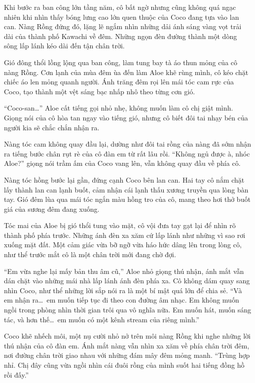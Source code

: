 ﻿\documentclass[../main.tex]{subfiles}
\begin{document}
Khi bước ra ban công lớn tầng năm, cô bất ngờ nhưng cũng không quá ngạc nhiên khi nhìn thấy bóng lưng cao lớn quen thuộc của Coco đang tựa vào lan can. Nàng Rồng đứng đó, lặng lẽ ngắm nhìn những dải ánh sáng vàng vọt trải dài của thành phố Kawachi về đêm. Những ngọn đèn đường thành một dòng sông lấp lánh kéo dài đến tận chân trời.

Gió đông thổi lồng lộng qua ban công, làm tung bay tà áo thun mỏng của cô nàng Rồng. Cơn lạnh của mùa đêm ùa đến làm Aloe khẽ rùng mình, cô kéo chặt chiếc áo len mỏng quanh người. Ánh trăng đêm rọi lên mái tóc cam rực của Coco, tạo thành một vệt sáng bạc nhấp nhô theo từng cơn gió.

``Coco-san\dots'' Aloe cất tiếng gọi nhỏ nhẹ, không muốn làm cô chị giật mình. Giọng nói của cô hòa tan ngay vào tiếng gió, nhưng cô biết đôi tai nhạy bén của người kia sẽ chắc chắn nhận ra.

Nàng tóc cam không quay đầu lại, dường như đôi tai rồng của nàng đã sớm nhận ra tiếng bước chân rụt rè của cô đàn em từ rất lâu rồi. ``Không ngủ được à, nhóc Aloe?'' giọng nói trầm ấm của Coco vang lên, vẫn không quay đầu về phía cô.

Nàng tóc hồng bước lại gần, đứng cạnh Coco bên lan can. Hai tay cô nắm chặt lấy thành lan can lạnh buốt, cảm nhận cái lạnh thấu xương truyền qua lòng bàn tay. Gió đêm lùa qua mái tóc ngắn màu hồng tro của cô, mang theo hơi thở buốt giá của sương đêm đang xuống.

Tóc mai của Aloe bị gió thổi tung vào mặt, cô vội đưa tay gạt lại để nhìn rõ thành phố phía trước. Những ánh đèn xa xăm cứ lấp lánh như những vì sao rơi xuống mặt đất. Một cảm giác vừa bỡ ngỡ vừa háo hức dâng lên trong lòng cô, như thể trước mắt cô là một chân trời mới đang chờ đợi.

``Em vừa nghe lại mấy bản thu âm cũ,'' Aloe nhỏ giọng thú nhận, ánh mắt vẫn dán chặt vào những mái nhà lấp lánh ánh đèn phía xa. Cô không dám quay sang nhìn Coco, như thể những lời sắp nói ra là một bí mật quá lớn để chia sẻ. ``Và em nhận ra\dots\ em muốn tiếp tục đi theo con đường âm nhạc. Em không muốn ngồi trong phòng nhìn thời gian trôi qua vô nghĩa nữa. Em muốn hát, muốn sáng tác, và hơn thế\dots\ em muốn có một kênh stream của riêng mình.''

Coco khẽ nhếch môi, một nụ cười nhỏ nở trên môi nàng Rồng khi nghe những lời thú nhận của cô đàn em. Ánh mắt nàng vẫn nhìn xa xăm về phía chân trời đêm, nơi đường chân trời giao nhau với những đám mây đêm mỏng manh. ``Trùng hợp nhỉ. Chị đây cũng vừa ngồi nhìn cái đuôi rồng của mình suốt hai tiếng đồng hồ rồi đấy.''
\end{document}
